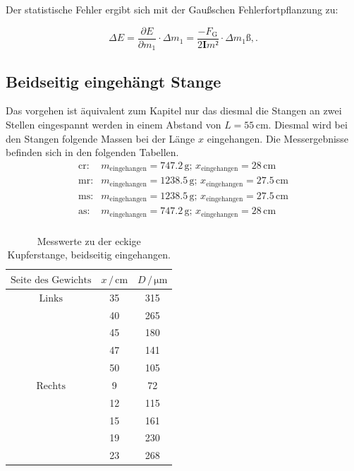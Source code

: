 Der statistische Fehler ergibt sich mit der Gaußschen Fehlerfortpflanzung zu: 

\begin{equation*}
\Delta E = \frac{\partial E}{\partial m_1}\cdot \Delta m_1 
= \frac{-F_\text{G}}{2\symbf{I}m²} \cdot \Delta m_1 ß, .
\end{equation*}

\subsection{Beidseitig eingehängt Stange}
Das vorgehen ist äquivalent zum Kapitel nur das diesmal die Stangen an zwei Stellen eingespannt werden in einem Abstand von $L = 55 \, \si{\centi\meter}$.
 Diesmal wird bei den Stangen folgende Massen bei der Länge $x$ eingehangen. Die Messergebnisse befinden sich in den folgenden Tabellen.
\begin{align*}
    \text{cr}:& m_\text{eingehangen} = 747.2 \, \si{\gram}; \, x_\text{eingehangen} = 28 \, \si{\centi\meter} \\
    \text{mr}:& m_\text{eingehangen} = 1238.5 \, \si{\gram};\,  x_\text{eingehangen} = 27.5 \, \si{\centi\meter} \\
    \text{ms}:& m_\text{eingehangen} = 1238.5 \, \si{\gram};\,  x_\text{eingehangen} = 27.5 \, \si{\centi\meter} \\
    \text{as}:& m_\text{eingehangen} = 747.2 \, \si{\gram}; \, x_\text{eingehangen} = 28 \, \si{\centi\meter}   \\
\end{align*}

\begin{table}
	\centering
	\caption{Messwerte zu der eckige Kupferstange, beidseitig eingehangen.} 
	\label{tab:vana} 
	\begin{tabular}{c c c}
	\toprule
	$\text{Seite des Gewichts} $&$x \, / \, \si{\centi\meter}$ & $D \, / \, \si{\micro\meter}$\\
	\midrule
    $\text{Links}$    &    35     &    315 \\
        &    40     &    265 \\
        &    45     &    180 \\
        &    47     &    141 \\
        &    50     &    105 \\
    $\text{Rechts}$    &    9       &    72 \\
        &    12      &   115 \\
        &    15      &   161 \\
        &    19      &   230 \\
        &    23      &   268 \\
\bottomrule
	\end{tabular}
\end{table}

